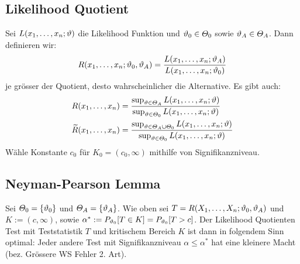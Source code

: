 \BoxEnd{}
\subsection{Likelihood Quotient}
Sei $L (x_1, \dots, x_n; \vartheta)$ die Likelihood Funktion und $\vartheta_0 \in
  \varTheta_0$ sowie $\vartheta_A \in \varTheta_A$. Dann definieren wir:
\begin{align*}
  R (x_1, \dots, x_n; \vartheta_0, \vartheta_A) = \frac{L (x_1, \dots, x_n; \vartheta_A)}{L (x_1, \dots, x_n; \vartheta_0)}
\end{align*}
je grösser der Quotient, desto wahrscheinlicher die Alternative. Es gibt auch:
\begin{align*}
  R (x_1, \dots, x_n)             & = \frac{ \sup_{\vartheta \in \varTheta_A} L (x_1, \dots, x_n; \vartheta)}{\sup_{\vartheta \in \varTheta_0} L (x_1, \dots, x_n; \vartheta)}                  \\
  \widetilde{R} (x_1, \dots, x_n) & = \frac{ \sup_{\vartheta \in \varTheta_A \cup \varTheta_0} L (x_1, \dots, x_n; \vartheta)}{\sup_{\vartheta \in \varTheta_0} L (x_1, \dots, x_n; \vartheta)} \\
\end{align*}
Wähle Konstante $c_0$ für $K_0 =  (c_0, \infty)$ mithilfe von Signifikanzniveau.
\subsection{Neyman-Pearson Lemma}
Sei $\varTheta_0 = \{\vartheta_0\}$ und $\varTheta_A = \{\vartheta_A\}$. Wie oben sei $T =
  R (X_1, \dots, X_n; \vartheta_0, \vartheta_A)$ und $K := (c, \infty)$, sowie $\alpha^* :=
  P_{\vartheta_0}[T \in K] = P_{\vartheta_0}[T > c]$. Der Likelihood Quotienten Test mit
Teststatistik $T$ und kritischem Bereich $K$ ist dann in folgendem Sinn
optimal: Jeder andere Test mit Signifikanzniveau $\alpha \leq \alpha^*$ hat
eine kleinere Macht (bez. Grössere WS Fehler 2. Art).
